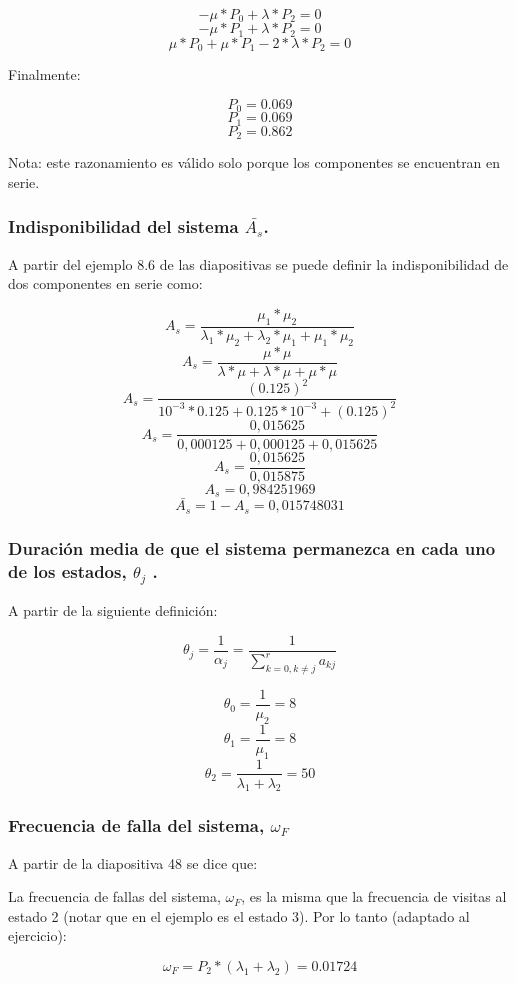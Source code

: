 \documentclass[
    11pt,
    spanish,
    a4paper
]{article}
\begin{document}
$$ -\mu * P_0 + \lambda * P_2 = 0 $$
$$ -\mu * P_1 + \lambda * P_2 = 0 $$
$$  \mu * P_0 + \mu * P_1   - 2 * \lambda * P_2 = 0 $$

Finalmente:

$$ P_0 = 0.069 $$
$$ P_1 = 0.069 $$
$$ P_2 = 0.862 $$

Nota: este razonamiento es válido solo porque los componentes se encuentran en serie.

\subsubsection{Indisponibilidad del sistema $ \bar{A_s} $.}

A partir del ejemplo 8.6 de las diapositivas se puede definir la indisponibilidad de dos componentes en serie como:


$$ A_s = \frac{\mu_1*\mu_2}{\lambda_1*\mu_2+\lambda_2*\mu_1+\mu_1*\mu_2}$$
$$ A_s = \frac{\mu *\mu}{\lambda*\mu+\lambda*\mu+\mu*\mu}$$
$$ A_s = \frac{(0.125)^2}{10^{-3} * 0.125 +0.125 * 10^{-3}+(0.125)^2}$$
$$ A_s = \frac{0,015625}{0,000125+0,000125+0,015625}$$
$$ A_s = \frac{0,015625}{0,015875}$$
$$ A_s = 0,984251969$$
$$ \bar{A_s} = 1 - A_s = 0,015748031 $$


\subsubsection{Duración media de que el sistema permanezca en cada uno de los estados, $ \theta_j $ .}

A partir de la siguiente definición:

$$ \theta_j = \frac{1}{\alpha_j} = \frac{1}{\sum_{k=0, k \neq j}^{r} a_{kj}} $$

$$ \theta_0 = \frac{1}{\mu_2} = 8 $$
$$ \theta_1 = \frac{1}{\mu_1} = 8 $$
$$ \theta_2 = \frac{1}{\lambda_1 + \lambda_2} = 50 $$

\subsubsection{Frecuencia de falla del sistema, $ \omega_F $}
\label{sss:omega}

A partir de la diapositiva 48 se dice que:

La frecuencia de fallas del sistema, $ \omega_F $, es la misma que la frecuencia de visitas
al estado 2 (notar que en el ejemplo es el estado 3). Por lo tanto (adaptado al ejercicio):

$$ \omega_F = P_2 * (\lambda_1 + \lambda_2) = 0.01724 $$
\end{document}
